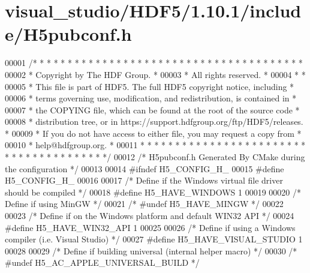 \hypertarget{visual__studio_2_h_d_f5_21_810_81_2include_2_h5pubconf_8h_source}{}\section{visual\+\_\+studio/\+H\+D\+F5/1.10.1/include/\+H5pubconf.h}
\label{visual__studio_2_h_d_f5_21_810_81_2include_2_h5pubconf_8h_source}

\begin{DoxyCode}
00001 \textcolor{comment}{/* * * * * * * * * * * * * * * * * * * * * * * * * * * * * * * * * * * * * * *}
00002 \textcolor{comment}{ * Copyright by The HDF Group.                                               *}
00003 \textcolor{comment}{ * All rights reserved.                                                      *}
00004 \textcolor{comment}{ *                                                                           *}
00005 \textcolor{comment}{ * This file is part of HDF5.  The full HDF5 copyright notice, including     *}
00006 \textcolor{comment}{ * terms governing use, modification, and redistribution, is contained in    *}
00007 \textcolor{comment}{ * the COPYING file, which can be found at the root of the source code       *}
00008 \textcolor{comment}{ * distribution tree, or in https://support.hdfgroup.org/ftp/HDF5/releases.  *}
00009 \textcolor{comment}{ * If you do not have access to either file, you may request a copy from     *}
00010 \textcolor{comment}{ * help@hdfgroup.org.                                                        *}
00011 \textcolor{comment}{ * * * * * * * * * * * * * * * * * * * * * * * * * * * * * * * * * * * * * * */}
00012 \textcolor{comment}{/* H5pubconf.h  Generated By CMake during the configuration */}
00013 
00014 \textcolor{preprocessor}{#ifndef H5\_CONFIG\_H\_}
00015 \textcolor{preprocessor}{#define H5\_CONFIG\_H\_}
00016 
00017 \textcolor{comment}{/* Define if the Windows virtual file driver should be compiled */}
00018 \textcolor{preprocessor}{#define H5\_HAVE\_WINDOWS 1}
00019 
00020 \textcolor{comment}{/* Define if using MinGW */}
00021 \textcolor{comment}{/* #undef H5\_HAVE\_MINGW */}
00022 
00023 \textcolor{comment}{/* Define if on the Windows platform and default WIN32 API */}
00024 \textcolor{preprocessor}{#define H5\_HAVE\_WIN32\_API 1}
00025 
00026 \textcolor{comment}{/* Define if using a Windows compiler (i.e. Visual Studio) */}
00027 \textcolor{preprocessor}{#define H5\_HAVE\_VISUAL\_STUDIO 1}
00028 
00029 \textcolor{comment}{/* Define if building universal (internal helper macro) */}
00030 \textcolor{comment}{/* #undef H5\_AC\_APPLE\_UNIVERSAL\_BUILD */}

\end{DoxyCode}
